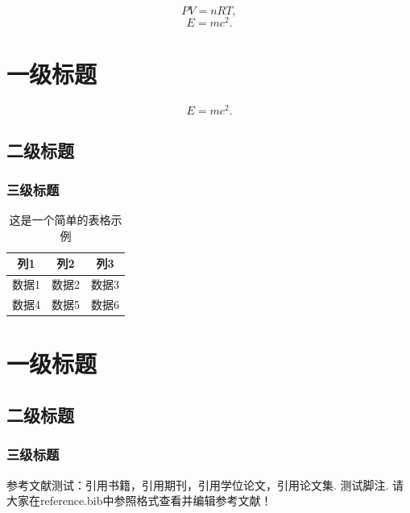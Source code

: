 \documentclass[zihao = -4,linespread = 1.38889, heading = true]{ctexbook} %
\begin{document}
\begin{equation}
  PV = nRT,
\end{equation}
\begin{equation}
  E = mc^2.
\end{equation}


\chapter{一级标题}
\zhlipsum[1]
\begin{equation}
  E = mc^2.
\end{equation}


\section{二级标题}
\zhlipsum[1-3]
\subsection{三级标题}
\zhlipsum[1-3]
\begin{table}
  \centering
  \caption{这是一个简单的表格示例}
  \vspace{0.5em}
  \begin{tabular}{ccc}
    \hline
    \hline
    列1 & 列2 & 列3 \\
    \hline
    数据1 & 数据2 & 数据3 \\
    数据4 & 数据5 & 数据6 \\
    \hline
  \end{tabular}
\end{table}

\chapter{一级标题}
\zhlipsum[1]
\section{二级标题}
\zhlipsum[1-3]
\subsection{三级标题}
\zhlipsum[1-3]

参考文献测试：引用书籍\cite{Guiner1982}，引用期刊\cite{Canvendish1985}，引用学位论文\cite{Cao1993}，引用论文集\cite{Jin1993}. 测试脚注\cite{footnote01}.
请大家在reference.bib中参照格式查看并编辑参考文献！


\printbibgscaep

\begin{acknowledgements}
  \zhlipsum[1] %
\end{acknowledgements}
\end{document}
